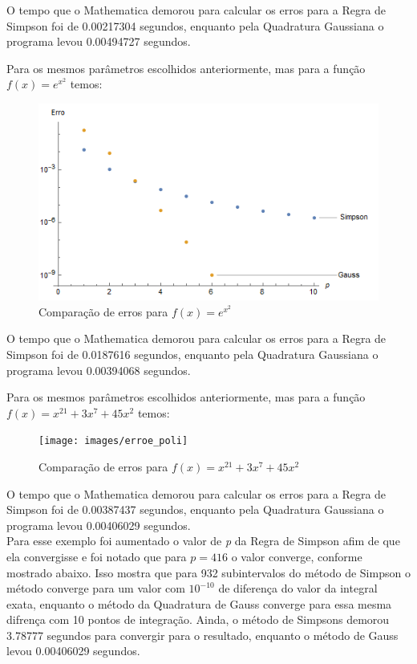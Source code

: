 \documentclass[12pt,a4paper]{article}
\begin{document}
\qquad O tempo que o Mathematica demorou para calcular os erros para a Regra de Simpson foi de 0.00217304 segundos, enquanto pela Quadratura Gaussiana o programa levou 0.00494727 segundos.


\newpage
\qquad Para os mesmos parâmetros escolhidos anteriormente, mas para a função $f(x)=e^{x^{2}}$ temos:


\begin{figure}[h]
\includegraphics{images/erro_e}
\caption{Comparação de erros para $f(x)=e^{x^{2}}$}
\end{figure}

\qquad O tempo que o Mathematica demorou para calcular os erros para a Regra de Simpson foi de 0.0187616 segundos, enquanto pela Quadratura Gaussiana o programa levou 0.00394068 segundos.

\newpage
\qquad Para os mesmos parâmetros escolhidos anteriormente, mas para a função $f(x)=x^{21} + 3 x^7 + 45 x^2$ temos:

\begin{figure}[h]
\texttt{[image: images/erroe\_poli]}
\caption{Comparação de erros para $f(x)=x^{21}+3x^7+45x^2$}
\end{figure}

\qquad O tempo que o Mathematica demorou para calcular os erros para a Regra de Simpson foi de 0.00387437 segundos, enquanto pela Quadratura Gaussiana o programa levou 0.00406029 segundos.\\

\newpage
\qquad Para esse exemplo foi aumentado o valor de \textit{p} da Regra de Simpson afim de que ela convergisse e foi notado que para $p=416$ o valor converge, conforme mostrado abaixo. Isso mostra que para 932 subintervalos do método de Simpson o método converge para um valor com $10^{-10}$ de diferença do valor da integral exata, enquanto o método da Quadratura de Gauss converge para essa mesma difrença com 10 pontos de integração. Ainda, o método de Simpsons demorou 3.78777 segundos para convergir para o resultado, enquanto o método de Gauss levou 0.00406029 segundos.
\end{document}
